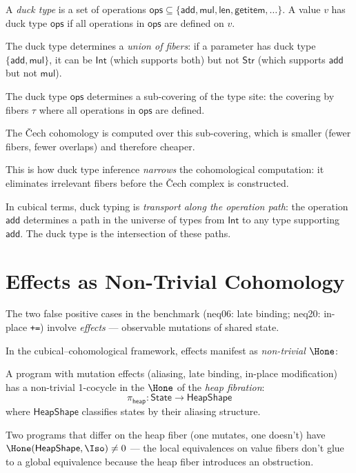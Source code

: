 \begin{definition}
A \emph{duck type} is a set of operations $\mathsf{ops} \subseteq
\{\mathsf{add}, \mathsf{mul}, \mathsf{len}, \mathsf{getitem},
\ldots\}$.  A value $v$ has duck type $\mathsf{ops}$ if all operations
in $\mathsf{ops}$ are defined on $v$.
\end{definition}

The duck type determines a \emph{union of fibers}: if a parameter has
duck type $\{\mathsf{add}, \mathsf{mul}\}$, it can be $\mathsf{Int}$
(which supports both) but not $\mathsf{Str}$ (which supports
$\mathsf{add}$ but not $\mathsf{mul}$).

\begin{proposition}
The duck type $\mathsf{ops}$ determines a sub-covering of the type
site: the covering by fibers $\tau$ where all operations in
$\mathsf{ops}$ are defined.

The \v{C}ech cohomology is computed over this sub-covering, which is
smaller (fewer fibers, fewer overlaps) and therefore cheaper.
\end{proposition}

This is how duck type inference \emph{narrows} the cohomological
computation: it eliminates irrelevant fibers before the \v{C}ech
complex is constructed.

In cubical terms, duck typing is \emph{transport along the operation
path}: the operation $\mathsf{add}$ determines a path in the universe
of types from $\mathsf{Int}$ to any type supporting $\mathsf{add}$.
The duck type is the intersection of these paths.

\section{Effects as Non-Trivial Cohomology}

The two false positive cases in the benchmark (neq06: late binding;
neq20: in-place \texttt{+=}) involve \emph{effects} --- observable
mutations of shared state.

In the cubical--cohomological framework, effects manifest as
\emph{non-trivial $\Hone$}:

\begin{theorem}
\label{thm:effects}
A program with mutation effects (aliasing, late binding, in-place
modification) has a non-trivial 1-cocycle in the $\Hone$ of the
\emph{heap fibration}:
\[
  \pi_\mathsf{heap} : \mathsf{State} \to \mathsf{HeapShape}
\]
where $\mathsf{HeapShape}$ classifies states by their aliasing
structure.

Two programs that differ on the heap fiber (one mutates, one doesn't)
have $\Hone(\mathsf{HeapShape}, \Iso) \neq 0$ --- the local
equivalences on value fibers don't glue to a global equivalence
because the heap fiber introduces an obstruction.
\end{theorem}

